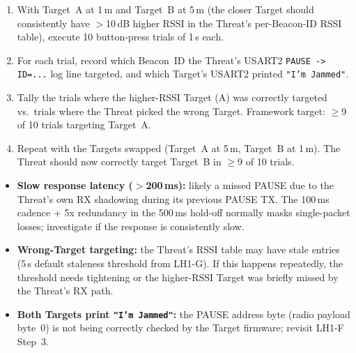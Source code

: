 \documentclass[11pt,letterpaper]{article}
\begin{document}
	\begin{tcolorbox}[infobox={Test Protocol: S5 RSSI-Targeting Accuracy}]
		\begin{enumerate}
			\item With Target~A at 1\,m and Target~B at 5\,m (the closer Target should consistently have $>$10\,dB higher RSSI in the Threat's per-Beacon-ID RSSI table), execute 10 button-press trials of 1\,s each.
			\item For each trial, record which Beacon~ID the Threat's USART2 \texttt{PAUSE -> ID=...} log line targeted, and which Target's USART2 printed \texttt{"I'm Jammed"}.
			\item Tally the trials where the higher-RSSI Target (A) was correctly targeted vs.\ trials where the Threat picked the wrong Target. Framework target: $\geq$9 of 10 trials targeting Target~A.
			\item Repeat with the Targets swapped (Target~A at 5\,m, Target~B at 1\,m). The Threat should now correctly target Target~B in $\geq$9 of 10 trials.
		\end{enumerate}
	\end{tcolorbox}

	\begin{tcolorbox}[warning={S5 Failure Modes Worth Documenting}]
		\begin{itemize}
			\item \textbf{Slow response latency ($>$200\,ms):} likely a missed PAUSE due to the Threat's own RX shadowing during its previous PAUSE TX. The 100\,ms cadence + 5x redundancy in the 500\,ms hold-off normally masks single-packet losses; investigate if the response is consistently slow.
			\item \textbf{Wrong-Target targeting:} the Threat's RSSI table may have stale entries (5\,s default staleness threshold from LH1-G). If this happens repeatedly, the threshold needs tightening or the higher-RSSI Target was briefly missed by the Threat's RX path.
			\item \textbf{Both Targets print \texttt{"I'm Jammed"}:} the PAUSE address byte (radio payload byte~0) is not being correctly checked by the Target firmware; revisit LH1-F Step~3.
		\end{itemize}
	\end{tcolorbox}
\end{document}
